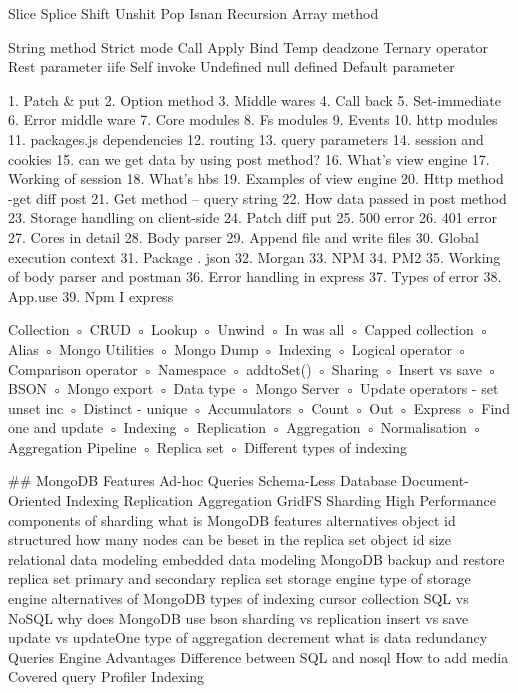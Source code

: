 Slice 
Splice
Shift
Unshit
Pop
Isnan
Recursion
Array method 

String method
Strict mode
Call 
Apply
Bind
Temp deadzone
Ternary operator
Rest parameter
iife
Self invoke
Undefined null defined
Default parameter


 1.	Patch & put 
2.	Option method 
3.	Middle wares
4.	Call back
5.	 Set-immediate
6.	Error middle ware 
7.	Core modules 
8.	Fs modules 
9.	Events
10.	http modules
11.	packages.js dependencies
12.	routing
13.	query parameters
14.	session and cookies
15.	can we get data by using post method?
16.	What’s view engine
17.	Working of session
18.	What’s hbs
19.	Examples of view engine
20.	Http method -get diff post 
21.	Get method – query string
22.	How data passed in post method
23.	Storage handling on client-side
24.	Patch diff put 
25.	500 error
26.	401 error
27.	Cores in detail
28.	Body parser
29.	Append file and write files
30.	Global execution context
31.	Package . json
32.	Morgan
33.	NPM 
34.	PM2 
35.	Working of body parser and postman
36.	Error handling in express
37.	Types of error 
38.	App.use
39.	Npm I express


 Collection
 ◦ CRUD
 ◦ Lookup
 ◦ Unwind
 ◦ In was all
 ◦ Capped collection
 ◦ Alias
 ◦ Mongo Utilities
 ◦ Mongo Dump
 ◦ Indexing
 ◦ Logical operator
 ◦ Comparison operator
 ◦ Namespace
 ◦ addtoSet()
 ◦ Sharing
 ◦ Insert vs save
 ◦ BSON
 ◦ Mongo export
 ◦ Data type
 ◦ Mongo Server
 ◦ Update operators - set unset inc
 ◦ Distinct - unique
 ◦ Accumulators
 ◦ Count
 ◦ Out
 ◦ Express
 ◦ Find one and update
 ◦ Indexing
 ◦ Replication
 ◦ Aggregation
 ◦ Normalisation
 ◦ Aggregation Pipeline
 ◦ Replica set
 ◦ Different types of indexing


## MongoDB Features
Ad-hoc Queries
Schema-Less Database
Document-Oriented
Indexing
Replication
Aggregation
GridFS
Sharding
High Performance
components of sharding 
what is MongoDB features alternatives 
object id structured 
how many nodes can be beset in the replica set 
object id size 
relational data modeling 
embedded data modeling 
MongoDB backup and restore 
replica set 
primary and secondary replica set 
storage engine type of storage engine 
alternatives of MongoDB
types of indexing  
cursor
collection 
SQL vs NoSQL 
why does MongoDB use bson
sharding vs replication 
insert vs save 
update vs updateOne 
type of aggregation 
decrement 
what is data redundancy 
Queries
Engine
Advantages
Difference between SQL and nosql
How to add media
Covered query
Profiler
Indexing


